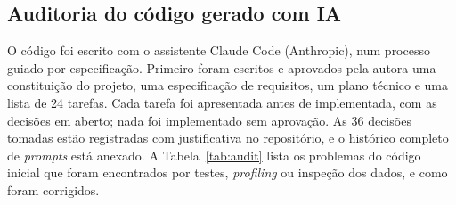 \subsection{Auditoria do código gerado com IA}\label{sec:audit}

O código foi escrito com o assistente Claude Code (Anthropic), num processo guiado por
especificação. Primeiro foram escritos e aprovados pela autora uma constituição do
projeto, uma especificação de requisitos, um plano técnico e uma lista de 24 tarefas.
Cada tarefa foi apresentada antes de implementada, com as decisões em aberto; nada foi
implementado sem aprovação. As 36 decisões tomadas estão registradas com justificativa no
repositório, e o histórico completo de \emph{prompts} está anexado. A
Tabela~\ref{tab:audit} lista os problemas do código inicial que foram encontrados por
testes, \emph{profiling} ou inspeção dos dados, e como foram corrigidos.

